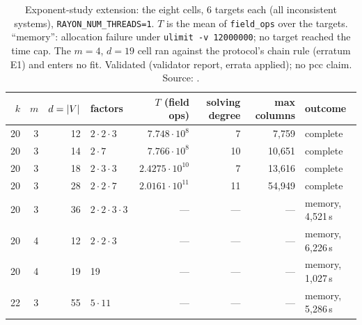\begin{table}[t]
\centering\small
\begin{tabular}{@{}rrrlrrrl@{}}
\toprule
$k$ & $m$ & $d=\lvert V \rvert$ & factors & $T$ (field ops) & solving degree & max columns & outcome \\
\midrule
20 & 3 & 12 & $2\cdot2\cdot3$ & $7.748\cdot10^8$ & 7 & 7{,}759 & complete \\
20 & 3 & 14 & $2\cdot7$ & $7.766\cdot10^8$ & 10 & 10{,}651 & complete \\
20 & 3 & 18 & $2\cdot3\cdot3$ & $2.4275\cdot10^{10}$ & 7 & 13{,}616 & complete \\
20 & 3 & 28 & $2\cdot2\cdot7$ & $2.0161\cdot10^{11}$ & 11 & 54{,}949 & complete \\
20 & 3 & 36 & $2\cdot2\cdot3\cdot3$ & --- & --- & --- & memory, 4{,}521\,s \\
20 & 4 & 12 & $2\cdot2\cdot3$ & --- & --- & --- & memory, 6{,}226\,s \\
20 & 4 & 19 & 19 & --- & --- & --- & memory, 1{,}027\,s \\
22 & 3 & 55 & $5\cdot11$ & --- & --- & --- & memory, 5{,}286\,s \\
\bottomrule
\end{tabular}
\caption[]{Exponent-study extension: the eight cells, 6 targets each (all
inconsistent systems), \texttt{RAYON\_NUM\_THREADS=1}. $T$ is the mean of
\texttt{field\_ops} over the targets. ``memory'': allocation failure under
\texttt{ulimit -v 12000000}; no target reached the time cap. The $m=4$,
$d=19$ cell ran against the protocol's chain rule (erratum E1) and enters no
fit. Validated (validator report, errata applied); no pcc claim. Source:
.}
\label{tab:fe-exponent}
\end{table}

